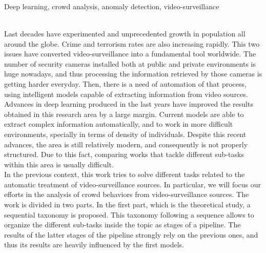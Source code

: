 \documentclass[../main.tex]{memoir}
\begin{document}
\thispagestyle{empty}

\begin{center}
  {\large\bfseries \ProjectTitleEng}\\
\end{center}

\begin{center}
  \AuthorName\\
  \vspace{0.7cm}
  \\
  Deep learning, crowd analysis, anomaly detection, video-surveillance\\
  \vspace{0.7cm}
  \\
\end{center}

Last decades have experimented and unprecedented growth in population
all around the globe. Crime and terrorism rates are also increasing
rapidly. This two issues have converted video-surveillance into a
fundamental tool worldwide. The number of security cameras installed
both at public and private environments is huge nowadays, and thus
processing the information retrieved by those cameras is getting
harder everyday. Then, there is a need of automation of that process,
using intelligent models capable of extracting information from video
sources.\\

Advances in deep learning produced in the last years have improved the
results obtained in this research area by a large margin. Current
models are able to extract complex information automatically, and to
work in more difficult environments, specially in terms of density of
individuals. Despite this recent advances, the area is still
relatively modern, and consequently is not properly structured. Due to
this fact, comparing works that tackle different sub-tasks within this
area is usually difficult.\\

In the previous context, this work tries to solve different tasks
related to the automatic treatment of video-surveillance sources. In
particular, we will focus our efforts in the analysis of crowd
behaviors from video-surveillance sources. The work is divided in two
parts. In the first part, which is the theoretical study, a sequential
taxonomy is proposed. This taxonomy following a sequence allows to
organize the different sub-tasks inside the topic as stages of a
pipeline. The results of the latter stages of the pipeline strongly
rely on the previous ones, and thus its results are heavily influenced
by the first models.\\
\end{document}
